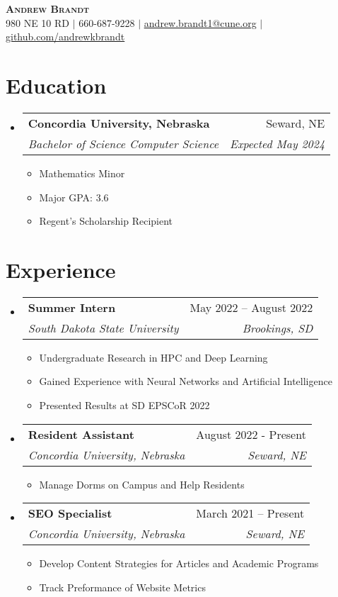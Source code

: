 \documentclass[letterpaper,11pt]{article}
\makeatletter
\newcommand{\resumeItem}[1]{
  \item\small{
    {#1 \vspace{-2pt}}
  }
}
\newcommand{\resumeSubheading}[4]{
  \vspace{-2pt}\item
    \begin{tabular*}{0.97\textwidth}[t]{l@{\extracolsep{\fill}}r}
      \textbf{#1} & #2 \\
      \textit{\small#3} & \textit{\small #4} \\
    \end{tabular*}\vspace{-7pt}
}
\newcommand{\resumeSubHeadingListStart}{\begin{itemize}[leftmargin=0.15in, label={}]}
\newcommand{\resumeSubHeadingListEnd}{\end{itemize}}
\newcommand{\resumeItemListStart}{\begin{itemize}}
\newcommand{\resumeItemListEnd}{\end{itemize}\vspace{-5pt}}
\makeatother
\begin{document}


\begin{center}
  \textbf{\Huge \scshape Andrew Brandt} \\ \vspace{1pt}
  \small 980 NE 10 RD $|$ \small 660-687-9228 $|$
  \href{mailto:andrew.brandt1@cune.org}{\underline{andrew.brandt1@cune.org}} $|$
  \href{https://github.com/andrewkbrandt}{\underline{github.com/andrewkbrandt}}
\end{center}


\section{Education}
\resumeSubHeadingListStart
\resumeSubheading
{Concordia University, Nebraska}{Seward, NE}
{Bachelor of Science Computer Science}{Expected May 2024}
\resumeItemListStart
\resumeItem{Mathematics Minor}
\resumeItem{Major GPA: 3.6}
\resumeItem{Regent's Scholarship Recipient}

\resumeItemListEnd




\resumeSubHeadingListEnd
\hspace{5mm}
\section{Experience}
\resumeSubHeadingListStart

\resumeSubheading
{Summer Intern}{May 2022 – August 2022}
{South Dakota State University}{Brookings, SD}
\resumeItemListStart
\resumeItem{Undergraduate Research in HPC and Deep Learning}
\resumeItem{Gained Experience with Neural Networks and Artificial Intelligence}
\resumeItem{Presented Results at SD EPSCoR 2022}
\resumeItemListEnd

\resumeSubheading
{Resident Assistant}{August 2022 - Present}
{Concordia University, Nebraska}{Seward, NE}
\resumeItemListStart
\resumeItem{Manage Dorms on Campus and Help Residents}
\resumeItemListEnd

\resumeSubheading
{SEO Specialist}{March 2021 – Present}
{Concordia University, Nebraska}{Seward, NE}
\resumeItemListStart
\resumeItem{Develop Content Strategies for Articles and Academic Programs}
\resumeItem{Track Preformance of Website Metrics}
\resumeItemListEnd


\resumeSubHeadingListEnd

\hspace{5mm}
\end{document}

